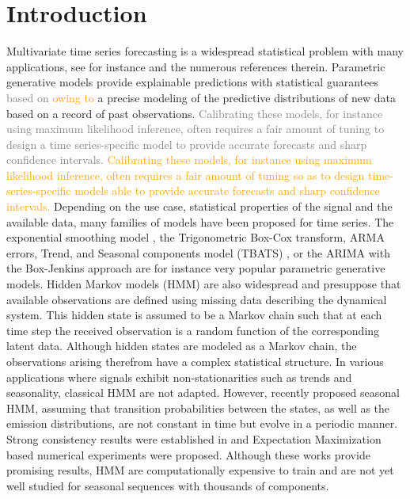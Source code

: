 \documentclass[10pt]{article} %
\begin{document}
\section{Introduction}
\label{sec:introduction}
Multivariate time series forecasting is a widespread statistical problem with  many applications, see for instance \citet{sarkka2013, douc2014, zucchini2017} and the numerous references therein.
Parametric generative models provide explainable predictions with statistical guarantees \textcolor{gray}{based on} \textcolor{orange}{owing to} a precise modeling of the predictive distributions of new data based on a record of past observations.
\textcolor{gray}{Calibrating these models, for instance using maximum likelihood inference, often requires a fair amount of tuning to design a time series-specific model to provide  accurate forecasts and sharp confidence intervals.} \textcolor{orange}{Calibrating these models, for instance using maximum likelihood inference, often requires a fair amount of tuning so as to design time-series-specific models able to provide  accurate forecasts and sharp confidence intervals.} Depending on the use case, statistical properties of the signal and the available data, many families of models have been proposed for time series.  The exponential smoothing model \citep{Brown1961}, the Trigonometric Box-Cox transform, ARMA errors, Trend, and Seasonal components model (TBATS) \citep{alysha2011}, or the ARIMA with the Box-Jenkins approach \citep{box2015} are for instance very popular parametric generative models.  Hidden Markov models (HMM) are also widespread and presuppose that available observations are defined using missing data describing the dynamical system. This hidden state is assumed to be a Markov chain such that at each time step the received observation is a random function of the corresponding latent data.  Although hidden states are modeled as a Markov chain, the observations arising therefrom have a complex statistical structure.
In various applications where signals exhibit non-stationarities such as trends and seasonality, classical HMM are not adapted. However, \citet{touron2017}  recently proposed seasonal HMM, assuming that transition probabilities between the states, as well as the emission distributions, are not constant in time but evolve in a periodic manner. Strong consistency results were established in \citet{touron2019} and Expectation Maximization based numerical experiments were proposed.
Although these works provide promising results, HMM are computationally expensive to train and are not yet well studied for seasonal  sequences with thousands of components.
 
\end{document}
